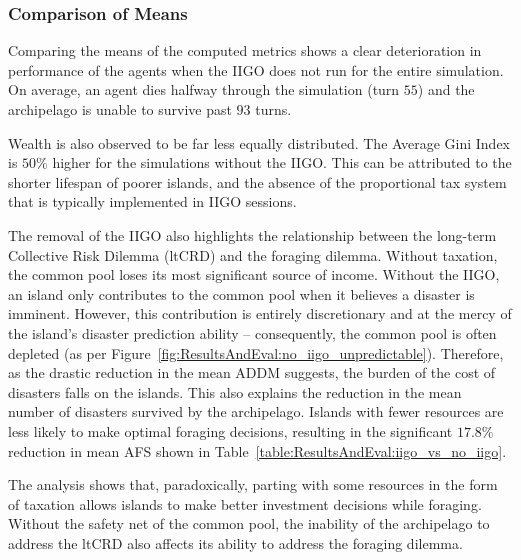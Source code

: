 \subsubsection{Comparison of Means}
\label{subsec:ResultsAndEval:no-iigo:comparison_of_means}
Comparing the means of the computed metrics shows a clear deterioration in performance of the agents when the IIGO does not run for the entire simulation. 
On average, an agent dies halfway through the simulation (turn $55$) and the archipelago is unable to survive past $93$ turns. 

Wealth is also observed to be far less equally distributed. The Average Gini Index is $50\%$ higher for the simulations without the IIGO. This can be attributed to the shorter lifespan of poorer islands, and the absence of the proportional tax system that is typically implemented in IIGO sessions. 

The removal of the IIGO also highlights the relationship between the long-term Collective Risk Dilemma (ltCRD) and the foraging dilemma. Without taxation, the common pool loses its most significant source of income. 
Without the IIGO, an island only contributes to the common pool when it believes a disaster is imminent. However, this contribution is entirely discretionary and at the mercy of the island's disaster prediction ability -- consequently, the common pool is often depleted (as per Figure~\ref{fig:ResultsAndEval:no_iigo_unpredictable}). 
Therefore, as the drastic reduction in the mean ADDM suggests, the burden of the cost of disasters falls on the islands. This also explains the reduction in the mean number of disasters survived by the archipelago. Islands with fewer resources are less likely to make optimal foraging decisions, resulting in the significant $17.8\%$ reduction in mean AFS shown in Table~\ref{table:ResultsAndEval:iigo_vs_no_iigo}.

The analysis shows that, paradoxically, parting with some resources in the form of taxation allows islands to make better investment decisions while foraging. Without the safety net of the common pool, the inability of the archipelago to address the ltCRD also affects its ability to address the foraging dilemma.


